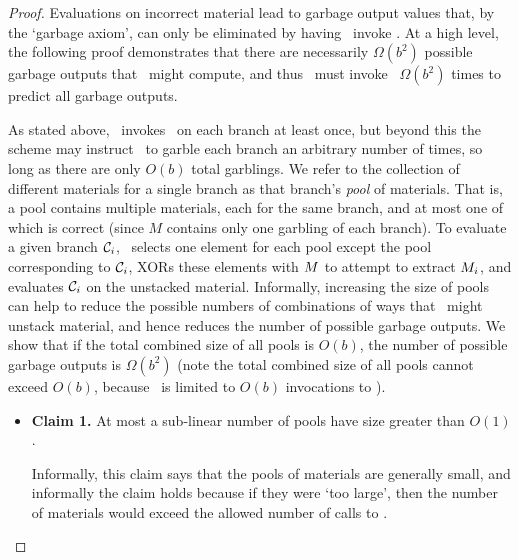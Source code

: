 \begin{proof}
Evaluations on incorrect material lead to garbage output values that,
by the `garbage axiom', can only be eliminated by having \Gen\ invoke
\Ev.
At a high level, the following proof demonstrates that there are
necessarily $\Omega(b^2)$ possible garbage outputs that \Eval\ might
compute, and thus \Gen\ must invoke \Ev\ $\Omega(b^2)$ times to
predict all garbage outputs.

As stated above, \Eval\ invokes \Gb\ on each branch at least once, but beyond this the
scheme may instruct \Eval\ to garble each branch an arbitrary number of
times, so long as there are only $O(b)$ total garblings.
%
We refer to the collection of different materials for a single branch
as that branch's \emph{pool} of materials.
That is, a pool contains multiple materials, each for the same branch,
and at most one of which is correct (since $M$ contains only one
garbling of each branch).
%
To evaluate a given branch $\mathcal C_i$, \Eval\ selects one element for
each pool except the pool corresponding to $\mathcal C_i$, XORs these
elements with $M$ to attempt to extract $M_i$, and evaluates
$\mathcal C_i$ on the unstacked material.
%
Informally, increasing the size of pools can help to reduce
the possible numbers of combinations of ways that \Eval\ might unstack
material, and hence reduces the number of possible garbage outputs.
%
We show that if the total combined size of all pools
is $O(b)$, the number of possible garbage outputs is $\Omega(b^2)$
(note the total combined size of all pools cannot exceed $O(b)$,
because \Eval\ is limited to $O(b)$ invocations to \Gb).


\begin{itemize}
  \item \textbf{Claim 1.} At most a sub-linear number of pools have
    size greater than $O(1)$.
    \begin{subproof}
      Informally, this claim says that the pools of materials are
      generally small, and informally the claim holds because if they
      were `too large', then the number of materials would exceed the
      allowed number of calls to \Gb.


\end{subproof}
\end{itemize}
\end{proof}
